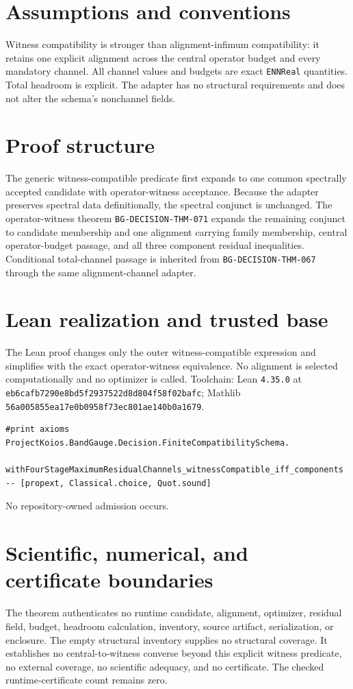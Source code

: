 \documentclass[10pt]{article}
\begin{document}
\section{Assumptions and conventions}
Witness compatibility is stronger than alignment-infimum compatibility: it retains one explicit
alignment across the central operator budget and every mandatory channel. All channel values and
budgets are exact \texttt{ENNReal} quantities. Total headroom is explicit. The adapter has no
structural requirements and does not alter the schema's nonchannel fields.

\section{Proof structure}
The generic witness-compatible predicate first expands to one common spectrally accepted candidate
with operator-witness acceptance. Because the adapter preserves spectral data definitionally, the
spectral conjunct is unchanged. The operator-witness theorem
\texttt{BG-DECISION-THM-071} expands the remaining conjunct to candidate membership and one
alignment carrying family membership, central operator-budget passage, and all three component
residual inequalities. Conditional total-channel passage is inherited from
\texttt{BG-DECISION-THM-067} through the same alignment-channel adapter.

\section{Lean realization and trusted base}
The Lean proof changes only the outer witness-compatible expression and simplifies with the exact
operator-witness equivalence. No alignment is selected computationally and no optimizer is called.
Toolchain: Lean \texttt{4.35.0} at
\texttt{eb6cafb7290e8bd5f2937522d8d804f58f02bafc}; Mathlib
\texttt{56a005855ea17e0b0958f73ec801ae140b0a1679}.
\begin{verbatim}
#print axioms ProjectKoios.BandGauge.Decision.FiniteCompatibilitySchema.
  withFourStageMaximumResidualChannels_witnessCompatible_iff_components
-- [propext, Classical.choice, Quot.sound]
\end{verbatim}
No repository-owned admission occurs.

\section{Scientific, numerical, and certificate boundaries}
The theorem authenticates no runtime candidate, alignment, optimizer, residual field, budget,
headroom calculation, inventory, source artifact, serialization, or enclosure. The empty structural
inventory supplies no structural coverage. It establishes no central-to-witness converse beyond
this explicit witness predicate, no external coverage, no scientific adequacy, and no certificate.
The checked runtime-certificate count remains zero.
\end{document}

